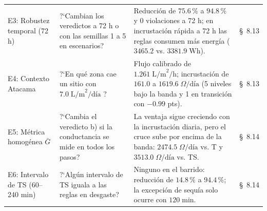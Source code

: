 \begin{table}[htbp]
\begin{tabularx}{\textwidth}{@{}L{2.5cm}L{4.0cm}Y L{1.5cm}@{}}
\addlinespace[2pt]
E3: Robustez temporal (72 h) & ?`Cambian los veredictos a 72 h o con las semillas 1 a 5 en escenarios? & Reducci\'on de $75.6\,\%$ a $94.8\,\%$ y 0 violaciones a 72 h; en incrustaci\'on r\'apida a 72 h las reglas consumen m\'as energ\'ia ($3465.2$ vs. $3381.9\;\text{Wh}$). & \S~8.13 \\
\addlinespace[2pt]
E4: Contexto Atacama & ?`En qu\'e zona cae un sitio con $7.0\;\text{L/m}^2\text{/d\'ia}$ \parencite{cereceda2008spatial}? & Flujo calibrado de $1.261\;\text{L/m}^2\text{/h}$; incrustaci\'on de $161.0$ a $1619.6\;\Omega\text{/d\'ia}$ (5 niveles bajo la banda y 1 en transici\'on con $-0.99$ pts). & \S~8.13 \\
\addlinespace[2pt]
E5: M\'etrica homog\'enea $\bar{G}$ & ?`Cambia el veredicto b) si la conductancia se mide en todos los pasos? & La ventaja sigue creciendo con la incrustaci\'on diaria, pero el cruce sube por encima de la banda: $2474.5\;\Omega\text{/d\'ia}$ vs. T y $3513.0\;\Omega\text{/d\'ia}$ vs. TS. & \S~8.14 \\
\addlinespace[2pt]
E6: Intervalo de TS (60--240 min) & ?`Alg\'un intervalo de TS iguala a las reglas en desgaste? & Ninguno en el barrido: reducci\'on de $14.8\,\%$ a $94.4\,\%$; la excepci\'on de sequ\'ia solo ocurre con $120\;\text{min}$. & \S~8.14 \\
\bottomrule
\end{tabularx}
\end{table}
